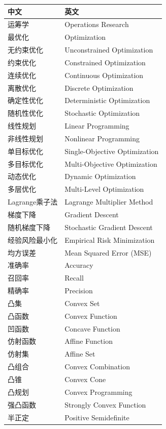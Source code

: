 \begin{table}[htbp]
\centering
\begin{tabular}{@{}ll@{}}
\toprule
\textbf{中文} & \textbf{英文} \\
\midrule
运筹学 & Operations Research \\
最优化 & Optimization \\
无约束优化 & Unconstrained Optimization \\
约束优化 & Constrained Optimization \\
连续优化 & Continuous Optimization \\
离散优化 & Discrete Optimization \\
确定性优化 & Deterministic Optimization \\
随机性优化 & Stochastic Optimization \\
线性规划 & Linear Programming \\
非线性规划 & Nonlinear Programming \\
单目标优化 & Single-Objective Optimization \\
多目标优化 & Multi-Objective Optimization \\
动态优化 & Dynamic Optimization \\
多层优化 & Multi-Level Optimization \\
Lagrange乘子法 & Lagrange Multiplier Method \\
梯度下降 & Gradient Descent \\
随机梯度下降 & Stochastic Gradient Descent \\
经验风险最小化 & Empirical Risk Minimization \\
均方误差 & Mean Squared Error (MSE) \\
准确率 & Accuracy \\
召回率 & Recall \\
精确率 & Precision \\
凸集 & Convex Set \\
凸函数 & Convex Function \\
凹函数 & Concave Function \\
仿射函数 & Affine Function \\
仿射集 & Affine Set \\
凸组合 & Convex Combination \\
凸锥 & Convex Cone \\
凸规划 & Convex Programming \\
强凸函数 & Strongly Convex Function \\
半正定 & Positive Semidefinite \\
\bottomrule
\end{tabular}
\end{table}

\newpage

